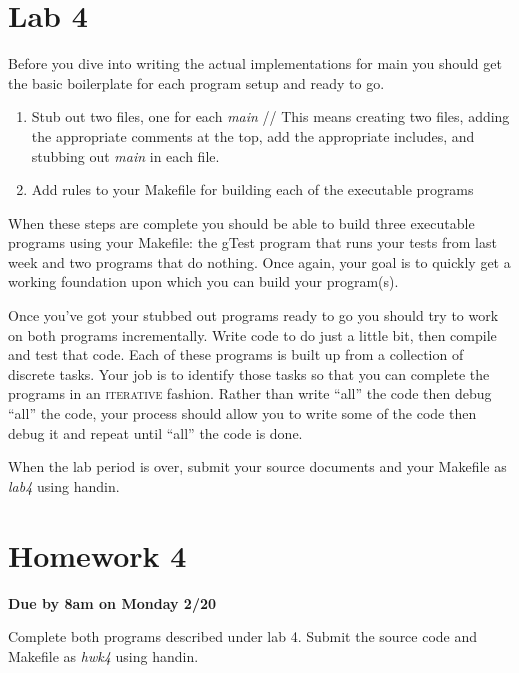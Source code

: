 \documentclass[]{tufte-handout}
\begin{document}
\newpage \thispagestyle{empty}

\section{Lab 4}

Before you dive into writing the actual implementations for main you should get the basic boilerplate for each program setup and ready to go.
\begin{enumerate}
\item Stub out two files, one for each \textit{main} //
This means creating two files, adding the appropriate comments at the top, add the appropriate includes, and stubbing out \textit{main} in each file.
\item Add rules to your Makefile for building each of the executable programs
\end{enumerate}
When these steps are complete you should be able to build three executable programs using your Makefile: the gTest program that runs your tests from last week and two programs that do nothing. Once again, your goal is to quickly get a working foundation upon which you can build your program(s).

Once you've got your stubbed out programs ready to go you should try to work on both programs incrementally. Write code to do just a little bit, then compile and test that code. Each of these programs is built up from a collection of discrete tasks. Your job is to identify those tasks so that you can complete the programs in an \textsc{iterative} fashion. Rather than write ``all'' the code then debug ``all'' the code, your process should allow you to write some of the code then debug it and repeat until ``all'' the code is done.

When the lab period is over, submit your source documents and your Makefile as \textit{lab4} using handin.
\newpage \thispagestyle{empty}

\section{Homework 4}

\begin{center}
\textbf{Due by 8am on Monday 2/20}
\end{center}

Complete both programs described under lab 4. Submit the source code and Makefile as \textit{hwk4} using handin.
\end{document}

